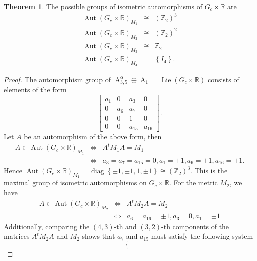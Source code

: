 \documentclass[12pt,a4paper,twoside]{article}
\theoremstyle{definition}
\newtheorem{theorem}{Theorem}[section]
\begin{document}
\begin{theorem} 
The possible groups of isometric automorphisms of $G_{c} \times \mathbb{R}$ are
\begin{eqnarray*}
\operatorname{Aut}\left(G_{c} \times \mathbb{R}\right)_{M_1}  &\cong& \left(\mathbb{Z}_2\right)^3\\
\operatorname{Aut}\left(G_{c} \times \mathbb{R}\right)_{M_2}  &\cong& \left(\mathbb{Z}_2\right)^2\\
\operatorname{Aut}\left(G_{c} \times \mathbb{R}\right)_{M_3}  &\cong& \mathbb{Z}_2\\
\operatorname{Aut}\left(G_{c} \times \mathbb{R}\right)_{M_4}  &=& \left\lbrace I_4\right\rbrace.
\end{eqnarray*}
\end{theorem}
\begin{proof}
The automorphism group of $\operatorname{A}_{3, 5}^{\alpha} \oplus \operatorname{A}_1 = \operatorname{Lie}(G_{c} \times \mathbb{R})$ consists of elements of the form \cite{christodoulakis2003automorphisms}
$$\begin{bmatrix}
a_1 & 0 & a_3 & 0\\
0 & a_6 & a_7 & 0\\
0 & 0 & 1 & 0\\
0 & 0 & a_{15} & a_{16}
\end{bmatrix}.$$
Let $A$ be an automorphism of the above form, then
\begin{eqnarray*}
A \in \operatorname{Aut}\left(G_{c} \times \mathbb{R}\right)_{M_1} &\Leftrightarrow& A^tM_1A = M_1\\
&\Leftrightarrow& a_3 = a_7 = a_{15} = 0, a_1 = \pm1, a_6 = \pm1, a_{16} = \pm1.
\end{eqnarray*}
Hence $\operatorname{Aut}\left(G_{c} \times \mathbb{R}\right)_{M_1} = \operatorname{diag}\left\lbrace \pm1, \pm1, 1, \pm1\right\rbrace \cong \left(\mathbb{Z}_2\right)^3$. This is the maximal group of isometric automorphisms on $G_{c} \times \mathbb{R}$. For the metric $M_2$, we have
\begin{eqnarray*}
A \in \operatorname{Aut}\left(G_{c} \times \mathbb{R}\right)_{M_2} &\Leftrightarrow& A^tM_2A = M_2\\
&\Leftrightarrow& a_6 = a_{16} = \pm1, a_3 = 0, a_1 = \pm1
\end{eqnarray*}
Additionally, comparing the $(4, 3)$-th and $(3, 2)$-th components of the matrices $A^tM_2A$ and $M_2$ shows that $a_7$ and $a_{15}$ must satisfy the following system
$$\left\lbrace\begin{array}{lll}

\end{array}$$
\end{proof}
\end{document}
